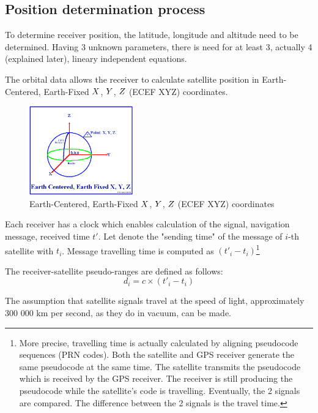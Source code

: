 \documentclass[a4paper,twoside,12pt]{memoir} %
\begin{document}
	\subsection{Position determination process}\label{sec:positionProcess}
	To determine receiver position, the latitude, longitude and altitude need to be determined. Having 3 unknown parameters, there is need for at least 3, actually 4 (explained later), lineary independent equations.
	
	The orbital data allows the receiver to calculate satellite position in 
	Earth-Centered, Earth-Fixed $\mathnormal{X}$, $\mathnormal{Y}$, $\mathnormal{Z}$ (ECEF XYZ) coordinates.~\cite{GPS:overview}
	\begin{figure}[H]
		\centering
		\includegraphics[width=0.4\textwidth]{ecefxyz.png}
		\caption{Earth-Centered, Earth-Fixed $\mathnormal{X}$, $\mathnormal{Y}$, $\mathnormal{Z}$  (ECEF XYZ) coordinates~\cite{GPS:overview}}
		\label{Fig:na}
	\end{figure}
	
	Each receiver has a clock which enables calculation of the signal, navigation message, received time $t'$.
	Let denote the "sending time" of the message of $i$-th satellite with $t_i$.
	Message travelling time is computed as 
	$(t'_i-t_i)$\footnote{
		More precise, travelling time is actually calculated by aligning pseudocode sequences
		(PRN codes).  Both the satellite and GPS receiver generate the same pseudocode at the same time. The satellite transmits the pseudocode which is received by the GPS receiver. 
		The receiver is still producing the pseudocode while the satellite's code is travelling. Eventually, the 2 signals are compared. The difference between the 2 signals is the travel time.}
	
	The receiver-satellite pseudo-ranges are defined as follows:
	$$d_i = c\times(t'_i-t_i)$$
	
	The assumption that satellite signals travel at the speed of light, approximately 300 000 km per second, as they do in vacuum, can be made.
	
\end{document}
